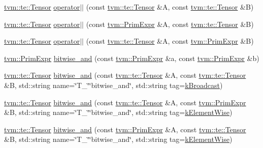 \begin{DoxyCompactItemize}
\item 
\hyperlink{classtvm_1_1te_1_1Tensor}{tvm\+::te\+::\+Tensor} \hyperlink{namespacetopi_a291b2f1db6f4072190a3c0100069f3cc}{operator$\vert$$\vert$} (const \hyperlink{classtvm_1_1te_1_1Tensor}{tvm\+::te\+::\+Tensor} \&A, const \hyperlink{classtvm_1_1te_1_1Tensor}{tvm\+::te\+::\+Tensor} \&B)
\item 
\hyperlink{classtvm_1_1te_1_1Tensor}{tvm\+::te\+::\+Tensor} \hyperlink{namespacetopi_af5aeed86f0e3adba1c78778e04692190}{operator$\vert$$\vert$} (const \hyperlink{classtvm_1_1PrimExpr}{tvm\+::\+Prim\+Expr} \&A, const \hyperlink{classtvm_1_1te_1_1Tensor}{tvm\+::te\+::\+Tensor} \&B)
\item 
\hyperlink{classtvm_1_1te_1_1Tensor}{tvm\+::te\+::\+Tensor} \hyperlink{namespacetopi_a7eb1ec922ee948b74be83603601801df}{operator$\vert$$\vert$} (const \hyperlink{classtvm_1_1te_1_1Tensor}{tvm\+::te\+::\+Tensor} \&A, const \hyperlink{classtvm_1_1PrimExpr}{tvm\+::\+Prim\+Expr} \&B)
\item 
\hyperlink{classtvm_1_1PrimExpr}{tvm\+::\+Prim\+Expr} \hyperlink{namespacetopi_adb0b26a18049c20f4c704ffdcfd9b26a}{bitwise\+\_\+and} (const \hyperlink{classtvm_1_1PrimExpr}{tvm\+::\+Prim\+Expr} \&a, const \hyperlink{classtvm_1_1PrimExpr}{tvm\+::\+Prim\+Expr} \&b)
\item 
\hyperlink{classtvm_1_1te_1_1Tensor}{tvm\+::te\+::\+Tensor} \hyperlink{namespacetopi_a4963bfc6eba6bab48c51bb8a1a492f0c}{bitwise\+\_\+and} (const \hyperlink{classtvm_1_1te_1_1Tensor}{tvm\+::te\+::\+Tensor} \&A, const \hyperlink{classtvm_1_1te_1_1Tensor}{tvm\+::te\+::\+Tensor} \&B, std\+::string name=\char`\"{}T\+\_\+\char`\"{}\char`\"{}bitwise\+\_\+and\char`\"{}, std\+::string tag=\hyperlink{namespacetopi_a794b9155e9ba9d1c9c42a1cff1fb645f}{k\+Broadcast})
\item 
\hyperlink{classtvm_1_1te_1_1Tensor}{tvm\+::te\+::\+Tensor} \hyperlink{namespacetopi_aeb77b0e9c82f6c4845637b60e2d2a508}{bitwise\+\_\+and} (const \hyperlink{classtvm_1_1te_1_1Tensor}{tvm\+::te\+::\+Tensor} \&A, const \hyperlink{classtvm_1_1PrimExpr}{tvm\+::\+Prim\+Expr} \&B, std\+::string name=\char`\"{}T\+\_\+\char`\"{}\char`\"{}bitwise\+\_\+and\char`\"{}, std\+::string tag=\hyperlink{namespacetopi_ac1b34ed59d38a5f5338bee6b2cad42be}{k\+Element\+Wise})
\item 
\hyperlink{classtvm_1_1te_1_1Tensor}{tvm\+::te\+::\+Tensor} \hyperlink{namespacetopi_a1942bddbf6c9c1ca1be1aa49359f67ce}{bitwise\+\_\+and} (const \hyperlink{classtvm_1_1PrimExpr}{tvm\+::\+Prim\+Expr} \&A, const \hyperlink{classtvm_1_1te_1_1Tensor}{tvm\+::te\+::\+Tensor} \&B, std\+::string name=\char`\"{}T\+\_\+\char`\"{}\char`\"{}bitwise\+\_\+and\char`\"{}, std\+::string tag=\hyperlink{namespacetopi_ac1b34ed59d38a5f5338bee6b2cad42be}{k\+Element\+Wise})

\end{DoxyCompactItemize}
